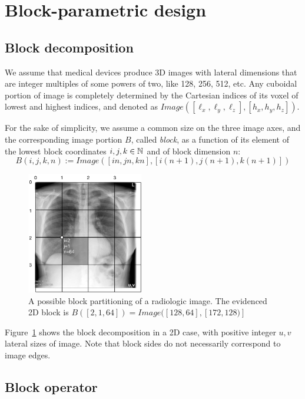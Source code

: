 

\section{Block-parametric design}\label{sec:filter}

\subsection{Block decomposition}\label{sec:bbbb}

We assume that medical devices produce 3D images with lateral dimensions that are integer multiples of some powers of two, like 128, 256, 512, etc.
Any cuboidal portion of image is completely determined by the Cartesian indices of its voxel of lowest and highest indices, and denoted as $Image([\ell_x, \ell_y, \ell_z],[h_x, h_y, h_z])$.

For the sake of simplicity, we assume a common size on the three image axes, and the corresponding image portion $B$, called \emph{block}, as a function of its element of the  lowest  block  coordinates $i,j,k\in\mathbb{N}$ and of block dimension $n$:
\[
B(i,j,k,n) := Image([in,jn,kn],[i(n+1),j(n+1),k(n+1)]) 
\]

\begin{figure}[htbp] %
   \centering
   \includegraphics[width=2in]{figs/blocks} 
   \caption{A possible block partitioning of a radiologic image. The evidenced 2D block is $B([2,1,64]) = Image([128,64],[172,128)]$}
   \label{fig:blocks}
\end{figure}


Figure~\ref{fig:blocks} shows the block decomposition in a 2D case, with positive integer $u,v$ lateral sizes of image. Note that block sides do not necessarily correspond to image edges. 


\subsection{Block operator }\label{sec:bbbb}

